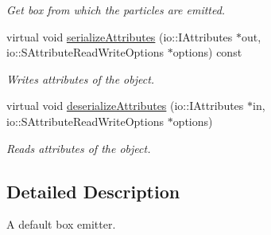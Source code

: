 \begin{DoxyCompactItemize}
\begin{DoxyCompactList}\small\item\em Get box from which the particles are emitted. \end{DoxyCompactList}\item 
\hypertarget{classirr_1_1scene_1_1_c_particle_box_emitter_a847d4efc8d4cf50eb919682c1c4823a2}{virtual void \hyperlink{classirr_1_1scene_1_1_c_particle_box_emitter_a847d4efc8d4cf50eb919682c1c4823a2}{serialize\-Attributes} (io\-::\-I\-Attributes $\ast$out, io\-::\-S\-Attribute\-Read\-Write\-Options $\ast$options) const }\label{classirr_1_1scene_1_1_c_particle_box_emitter_a847d4efc8d4cf50eb919682c1c4823a2}

\begin{DoxyCompactList}\small\item\em Writes attributes of the object. \end{DoxyCompactList}\item 
\hypertarget{classirr_1_1scene_1_1_c_particle_box_emitter_adcaf83b1168f9de2017eab6f93da6cd6}{virtual void \hyperlink{classirr_1_1scene_1_1_c_particle_box_emitter_adcaf83b1168f9de2017eab6f93da6cd6}{deserialize\-Attributes} (io\-::\-I\-Attributes $\ast$in, io\-::\-S\-Attribute\-Read\-Write\-Options $\ast$options)}\label{classirr_1_1scene_1_1_c_particle_box_emitter_adcaf83b1168f9de2017eab6f93da6cd6}

\begin{DoxyCompactList}\small\item\em Reads attributes of the object. \end{DoxyCompactList}\end{DoxyCompactItemize}


\subsection{Detailed Description}
A default box emitter. 

